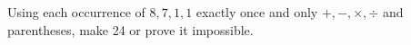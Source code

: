 Using each occurrence of $8,7,1,1$ exactly once and only $+,-,\times,\div$ and parentheses, make 24 or prove it impossible.
